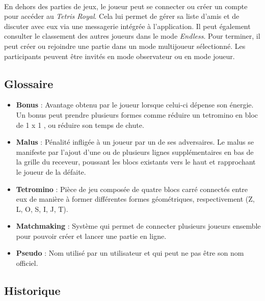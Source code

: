 \documentclass{article}
\begin{document}
\paragraph*{}

En dehors des parties de jeux, le joueur peut se connecter ou créer un compte pour accéder au \textit{Tetris Royal}. Cela lui permet de gérer sa liste d'amis et de discuter avec eux via une messagerie intégrée à l'application. Il peut également consulter le classement des autres joueurs dans le mode \textit{Endless}. Pour terminer, il peut créer ou rejoindre une partie dans un mode multijoueur sélectionné. Les participants peuvent être invités en mode observateur ou en mode joueur.

\newpage

\subsection{Glossaire}


\begin{itemize}
	\item \textbf{Bonus} : Avantage obtenu par le joueur lorsque celui-ci dépense son énergie. Un bonus peut prendre plusieurs formes comme réduire un tetromino en bloc de 1 x 1 , ou réduire son temps de chute. 
	\item \textbf{Malus} : Pénalité infligée à un joueur par un de ses adversaires. Le malus se manifeste par l'ajout d'une ou de plusieurs lignes supplémentaires en bas de la grille du receveur, poussant les blocs existants vers le haut et rapprochant le joueur de la défaite.
	\item \textbf{Tetromino} : Pièce de jeu composée de quatre blocs carré connectés entre eux de manière à former différentes formes géométriques, respectivement (Z, L, O, S, I, J, T). 
        \item \textbf{Matchmaking} : Système qui permet de connecter plusieurs joueurs ensemble pour pouvoir créer et lancer une partie en ligne.
        \item \textbf{Pseudo} : Nom utilisé par un utilisateur et qui peut ne pas être son nom officiel.
	
\end{itemize}

\subsection{Historique}

\newpage
\end{document}
